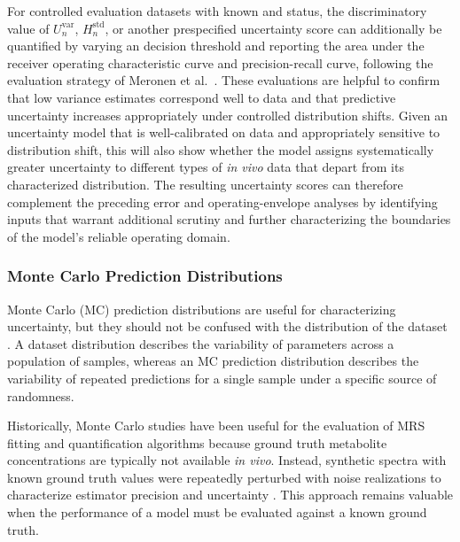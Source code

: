 For controlled evaluation datasets with known \ID and \OOD status, the discriminatory value of $U_n^{\mathrm{var}}$, $H_n^{\mathrm{std}}$, or another prespecified uncertainty score can additionally be quantified by varying an \OOD decision threshold and reporting the area under the receiver operating characteristic curve and precision-recall curve, following the evaluation strategy of Meronen et al.~\cite{Meronen2021}. These evaluations are helpful to confirm that low variance estimates correspond well to \ID data and that predictive uncertainty increases appropriately under controlled distribution shifts. Given an uncertainty model that is well-calibrated on \ID data and appropriately sensitive to distribution shift, this will also show whether the model assigns systematically greater uncertainty to different types of \textit{in vivo} data that depart from its characterized distribution. The resulting uncertainty scores can therefore complement the preceding error and operating-envelope analyses by identifying inputs that warrant additional scrutiny and further characterizing the boundaries of the model's reliable operating domain.

\subsubsection{Monte Carlo Prediction Distributions}
Monte Carlo (MC) prediction distributions are useful for characterizing uncertainty, but they should not be confused with the distribution of the dataset \cite{Rubinstein2016}. A dataset distribution describes the variability of parameters across a population of samples, whereas an MC prediction distribution describes the variability of repeated predictions for a single sample under a specific source of randomness.

Historically, Monte Carlo studies have been useful for the evaluation of MRS fitting and quantification algorithms because ground truth metabolite concentrations are typically not available \textit{in vivo}. Instead, synthetic spectra with known ground truth values were repeatedly perturbed with noise realizations to characterize estimator precision and uncertainty \cite{Instrella2024, Landheer2021b}. This approach remains valuable when the performance of a model must be evaluated against a known ground truth.

